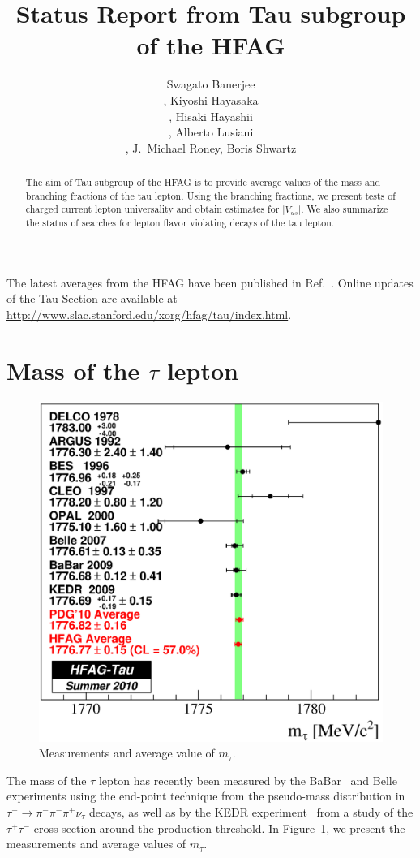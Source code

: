 \documentclass[fleqn,twoside]{article}
\title{Status Report from Tau subgroup of the HFAG}
\author{Swagato Banerjee\address[UVIC]{University of Victoria, Canada.},
        Kiyoshi Hayasaka\address{Nagoya University, Japan.},
        Hisaki Hayashii\address{Nara Womana's University, Japan.},
        Alberto Lusiani\address{Scuola Normale Superiore and INFN Pisa, Italy.},
        J.~Michael Roney\addressmark[UVIC],
        Boris Shwartz\address{Budker Institute of Nuclear Physics, Russia.}}
\begin{document}
\begin{abstract}
The aim of Tau subgroup of the HFAG is to provide average values
of the mass and branching fractions of the tau lepton.
Using the branching fractions, we present tests of charged current
lepton universality and obtain estimates for $|V_{us}|$.
We also summarize the status of searches for lepton flavor violating
decays of the tau lepton.
\vspace{1pc}
\end{abstract}

\maketitle

The latest averages from the HFAG have been published in Ref.~\cite{HFAG:2010qj}.
Online updates of the Tau Section are available at \url{http://www.slac.stanford.edu/xorg/hfag/tau/index.html}.

\section{Mass of the $\tau$ lepton}
\label{sec:Tau_Mass}

\begin{figure}[!hbtp]
\begin{center}
\includegraphics[height=.42\textheight,width=.49\textwidth]{figures/TauMass.eps}
\end{center}
\caption{Measurements and average value of $m_\tau$.}
\label{fig:Tau_Mass}
\end{figure}

The mass of the $\tau$ lepton has recently been measured by the BaBar~\cite{Aubert:2009ra} and Belle~\cite{Abe:2006vf} experiments
using the end-point technique from the pseudo-mass distribution in $\tau^-\to\pi^-\pi^-\pi^+\nu_\tau$ decays,
as well as by the KEDR experiment~\cite{Shamov:2009zz} from a study of the $\tau^+\tau^-$ cross-section around the production threshold.
In Figure~\ref{fig:Tau_Mass}, we present the measurements and average values of $m_\tau$.
\end{document}
